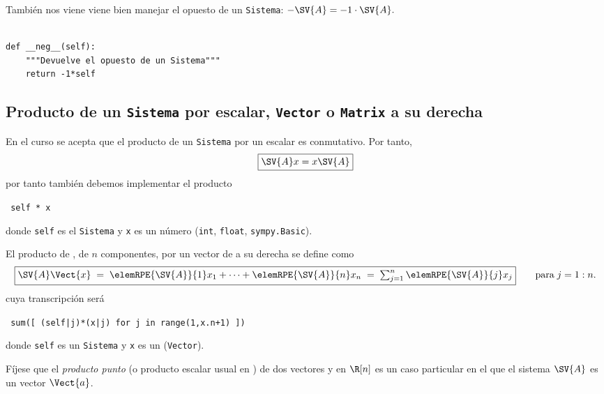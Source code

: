 \documentclass[11pt]{report}
\begin{document}
También nos viene viene bien manejar el opuesto de un \texttt{Sistema}:
\begin{math}
 -\SV{A}=-1\cdot\SV{A}.
\end{math}

\begin{verbatim}

def __neg__(self):
    """Devuelve el opuesto de un Sistema"""
    return -1*self

\end{verbatim}

\subsection{Producto de un \texttt{Sistema} por escalar, \texttt{Vector} o  \texttt{Matrix} a su derecha}
\label{sec:orgcadbc34}

En el curso se acepta que el producto de un \texttt{Sistema} por un escalar
es conmutativo. Por tanto,
\begin{displaymath}
  \fbox{\begin{math} 
           \SV{A}x=x\SV{A}
        \end{math}}
\end{displaymath}
por tanto también debemos implementar el producto
\begin{center}
  \Verb/ self * x /
\end{center}
donde \texttt{self} es el \texttt{Sistema} y \texttt{x} es un número (\texttt{int}, \texttt{float},
\texttt{sympy.Basic}).


El producto de , de \(n\) componentes, por un vector  de
\R[n] a su derecha se define como
\begin{displaymath}  
    \fbox{$\SV{A}\Vect{x}\;=\;\elemRPE{\SV{A}}{1}x_1+\cdots+\elemRPE{\SV{A}}{n}x_n\;=\;\sum_{j=1}^n\elemRPE{\SV{A}}{j}x_j$}
    \qquad\text{para}\; j=1:n.
\end{displaymath}
cuya transcripción será
\begin{center}
  \Verb/ sum([ (self|j)*(x|j) for j in range(1,x.n+1) ]) /
\end{center}
donde \texttt{self} es un \texttt{Sistema} y \texttt{x} es un (\texttt{Vector}).

Fíjese que el \emph{producto punto} (o producto escalar usual en \R[n]) de
dos vectores  y  en \(\R[n]\) es un caso particular en
el que el sistema \(\SV{A}\) es un vector \(\Vect{a}\).
\end{document}
